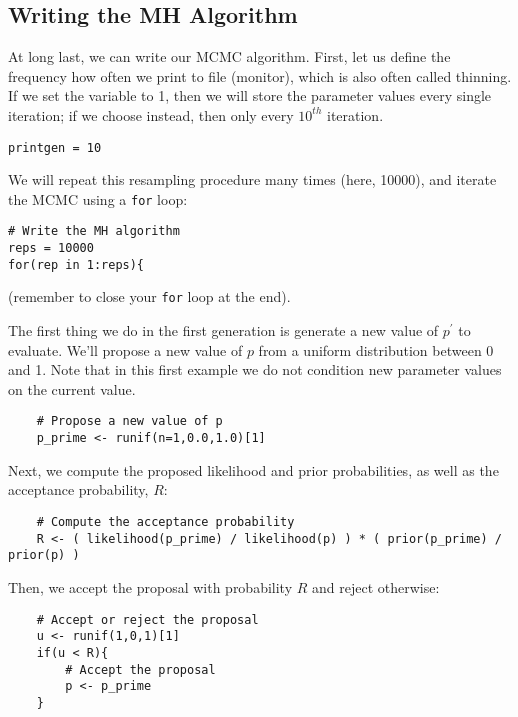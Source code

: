 \subsection{Writing the MH Algorithm}
At long last, we can write our MCMC algorithm.
First, let us define the frequency how often we print to file (\IE monitor), which is also often called thinning.
If we set the variable  to 1, then we will store the parameter values every single iteration; if we choose  instead, then only every $10^{th}$ iteration.
{\tt \begin{snugshade*}
\begin{lstlisting}    
printgen = 10
\end{lstlisting}
\end{snugshade*}}
We will repeat this resampling procedure many times (here, 10000), and iterate the MCMC using a \texttt{for} loop:
{\tt \begin{snugshade*}
\begin{lstlisting}    
# Write the MH algorithm
reps = 10000 
for(rep in 1:reps){
\end{lstlisting}
\end{snugshade*}}
(remember to close your \texttt{for} loop at the end).

The first thing we do in the first generation is generate a new value of $p^\prime$ to evaluate.
We'll propose a new value of $p$ from a uniform distribution between 0 and 1.
Note that in this first example we do not condition new parameter values on the current value.
{\tt \begin{snugshade*}
\begin{lstlisting}    
	# Propose a new value of p
	p_prime <- runif(n=1,0.0,1.0)[1]
\end{lstlisting}
\end{snugshade*}}

Next, we compute the proposed likelihood and prior probabilities, as well as the acceptance probability, $R$:
{\tt \begin{snugshade*}
\begin{lstlisting}    
	# Compute the acceptance probability
	R <- ( likelihood(p_prime) / likelihood(p) ) * ( prior(p_prime) / prior(p) )
\end{lstlisting}
\end{snugshade*}}

Then, we accept the proposal with probability $R$ and reject otherwise:
{\tt \begin{snugshade*}
\begin{lstlisting}    
	# Accept or reject the proposal
	u <- runif(1,0,1)[1]
	if(u < R){
		# Accept the proposal
		p <- p_prime
	}
\end{lstlisting}
\end{snugshade*}}

